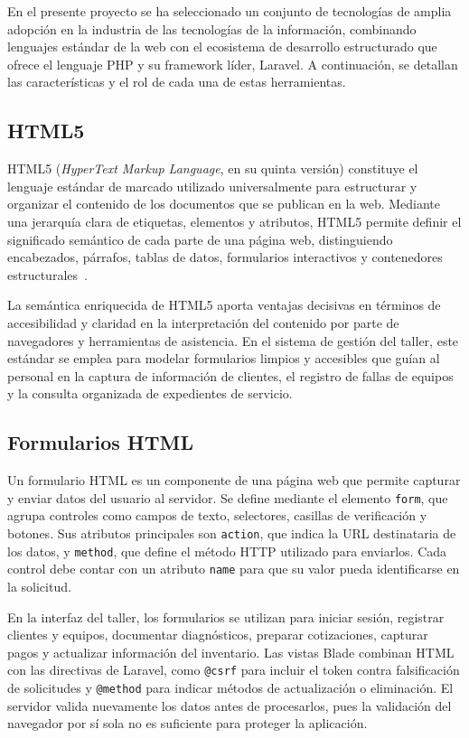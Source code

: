 En el presente proyecto se ha seleccionado un conjunto de tecnologías de amplia adopción en la industria de las tecnologías de la información, combinando lenguajes estándar de la web con el ecosistema de desarrollo estructurado que ofrece el lenguaje PHP y su framework líder, Laravel. A continuación, se detallan las características y el rol de cada una de estas herramientas.

\subsection{HTML5}

HTML5 (\textit{HyperText Markup Language}, en su quinta versión) constituye el lenguaje estándar de marcado utilizado universalmente para estructurar y organizar el contenido de los documentos que se publican en la web. Mediante una jerarquía clara de etiquetas, elementos y atributos, HTML5 permite definir el significado semántico de cada parte de una página web, distinguiendo encabezados, párrafos, tablas de datos, formularios interactivos y contenedores estructurales~\cite{mdn_web_dev}.

La semántica enriquecida de HTML5 aporta ventajas decisivas en términos de accesibilidad y claridad en la interpretación del contenido por parte de navegadores y herramientas de asistencia. En el sistema de gestión del taller, este estándar se emplea para modelar formularios limpios y accesibles que guían al personal en la captura de información de clientes, el registro de fallas de equipos y la consulta organizada de expedientes de servicio.

\subsection{Formularios HTML}

Un formulario HTML es un componente de una página web que permite capturar y enviar datos del usuario al servidor. Se define mediante el elemento \texttt{form}, que agrupa controles como campos de texto, selectores, casillas de verificación y botones. Sus atributos principales son \texttt{action}, que indica la URL destinataria de los datos, y \texttt{method}, que define el método HTTP utilizado para enviarlos. Cada control debe contar con un atributo \texttt{name} para que su valor pueda identificarse en la solicitud.

En la interfaz del taller, los formularios se utilizan para iniciar sesión, registrar clientes y equipos, documentar diagnósticos, preparar cotizaciones, capturar pagos y actualizar información del inventario. Las vistas Blade combinan HTML con las directivas de Laravel, como \texttt{@csrf} para incluir el token contra falsificación de solicitudes y \texttt{@method} para indicar métodos de actualización o eliminación. El servidor valida nuevamente los datos antes de procesarlos, pues la validación del navegador por sí sola no es suficiente para proteger la aplicación.

